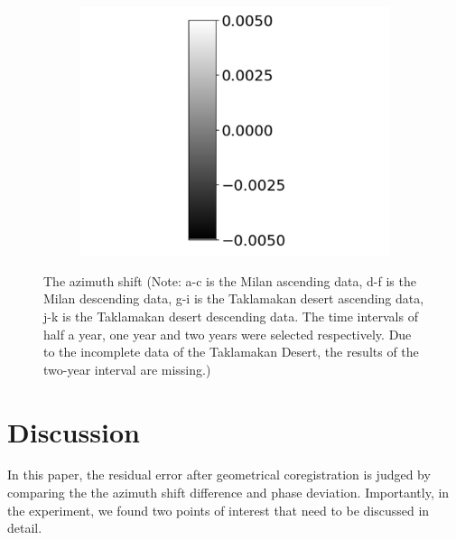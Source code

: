 \documentclass[preprint, authoryear]{elsarticle}
\begin{document}
\begin{figure}
\begin{subfigure}{0.3\textwidth}
        \centering
        \includegraphics[width=\textwidth]{figure/The azimuth shift/colorbar.png}
        \caption*{}
    \end{subfigure}
    \caption{The azimuth shift (Note: a-c is the Milan ascending data, d-f is the Milan descending data, g-i is the Taklamakan desert ascending data, j-k is the Taklamakan desert descending data. The time intervals of half a year, one year and two years were selected respectively. Due to the incomplete data of the Taklamakan Desert, the results of the two-year interval are missing.)}
    \label{fig_7}
\end{figure}


\section{Discussion}

In this paper, the residual error after geometrical coregistration is judged by comparing the the azimuth shift difference and phase deviation. Importantly, in the experiment, we found two points of interest that need to be discussed in detail. \par
\end{document}
